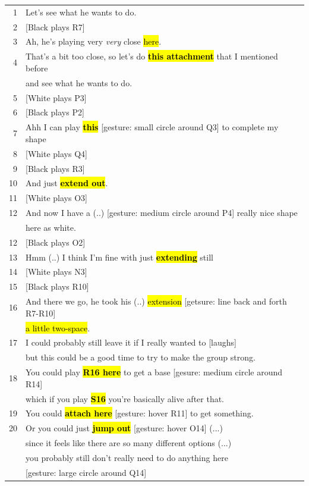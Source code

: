 \documentclass{scrartcl}
\DeclareRobustCommand{\hlcyan}[1]{\sethlcolor{cyan}\hl{#1}}
\DeclareRobustCommand{\hlcyan}[1]{#1}
\begin{document}
\begin{longtable}{rl}
 1 & Let’s see what he wants to do.\\
 2 &[Black plays R7]\\
 3 &Ah, he’s playing very \emph{very} close \hlcyan{here}.\\
 4 &That’s a bit too close, so let’s do \hl{\textbf{this attachment}} that I mentioned before \\
     & and see what he wants to do.\\
 5 &[White plays P3]\\
 6 &[Black plays P2]\\
 7 & Ahh I can play \hl{\textbf{this}} [gesture: small circle around Q3] to complete my shape \\
 8 &[White plays Q4]\\
 9 &[Black plays R3]\\
10 & And just \hl{\textbf{extend out}}. \\
11 &[White plays O3]\\
12 &And now I have a (..) [gesture: medium circle around P4] really nice shape \\
     & here as white.\\
12 &[Black plays O2]\\
13 &Hmm (..) I think I’m fine with just \hl{\textbf{extending}} still\\
14 &[White plays N3]\\
15 &[Black plays R10]\\
16 &And there we go, he took his (..) \hlcyan{extension} [getsure: line back and forth R7-R10] \\
   & \hlcyan{a little two-space}.\\
17 & I could probably still leave it if I really wanted to [laughs]\\
     & but this could be a good time to try to make the group strong.\\
18 & You could play \hl{\textbf{R16 here}} to get a base [gesure: medium circle around R14]\\
   & which if you play \hl{\textbf{S16}} you’re basically alive after that. \\
19 & You could \hl{\textbf{attach here}} [gesture: hover R11] to get something.\\
20 & Or you could just \hl{\textbf{jump out}} [gesture: hover O14] (...)\\
     & since it feels like there are so many different options (...)\\
     & you probably still don't really need to do anything here \\
     & [gesture: large circle around Q14]\\
\end{longtable}
\end{document}

